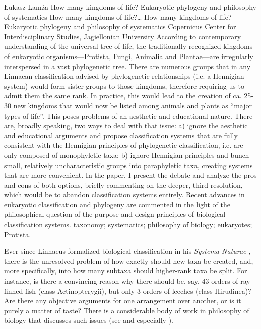 \begin{artengenv}
	{Łukasz Lamża}
	{How many kingdoms of life? Eukaryotic phylogeny and philosophy of systematics}
	{How many kingdoms of life?\ldots}
	{How many kingdoms of life? Eukaryotic phylogeny and philosophy of systematics}
	{Copernicus Center for Interdisciplinary Studies, Jagiellonian University}
	{According to contemporary understanding of the universal tree of life, the traditionally recognized kingdoms of
		eukaryotic organisms---Protista, Fungi, Animalia and Plantae---are irregularly interspersed in a vast phylogenetic
		tree. There are numerous groups that in any Linnaean classification advised by phylogenetic relationships (i.e. a
		Hennigian system) would form sister groups to those kingdoms, therefore requiring us to admit them the same rank. In
		practice, this would lead to the creation of ca. 25-30 new kingdoms that would now be listed among animals and plants
		as ``major types of life''. This poses problems of an aesthetic and educational nature. There are, broadly speaking, two
		ways to deal with that issue: a) ignore the aesthetic and educational arguments and propose classification systems that
		are fully consistent with the Hennigian principles of phylogenetic classification, i.e. are only composed of
		monophyletic taxa; b) ignore Hennigian principles and bunch small, relatively uncharacteristic groups into paraphyletic
		taxa, creating systems that are more convenient. In the paper, I present the debate and analyze the pros and cons of
		both options, briefly commenting on the deeper, third resolution, which would be to abandon classification systems
		entirely. Recent advances in eukaryotic classification and phylogeny are commented in the light of the philosophical
		question of the purpose and design principles of biological classification systems.}
	{taxonomy; systematics; philosophy of biology; eukaryotes; Protista.}



\lettrine[loversize=0.13,lines=2,lraise=-0.05,nindent=0em,findent=0.2pt]%
{E}{}ver since Linnaeus formalized biological classification in his \textit{Systema Naturae}
\parencite{linnaeus_systema_1788},
there is the unresolved problem of how exactly should new taxa be created,
and, more specifically, into how many subtaxa should higher-rank taxa be split. For instance, is there a convincing
reason why there should be, say, 43 orders of ray-finned fish (class Actinopterygii), but only 3 orders of leeches
(class Hirudinea)? Are there any objective arguments for one arrangement over another, or is it purely a matter of
taste? There is a considerable body of work in philosophy of biology that discusses such issues
(see \cite{hull_effect_1965,hull_contemporary_1970,schuh_biological_2011} and especially \cite{mayr_classifications_2002}).


\end{artengenv}
